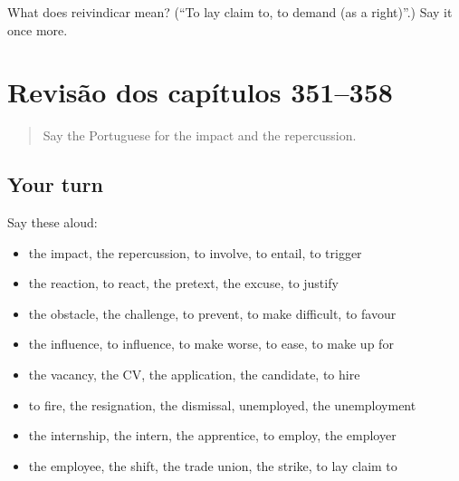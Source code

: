 \begin{tcolorbox}[breakable,colback=teal!4,colframe=teal!35!black,title={Before you move on}]
What does reivindicar mean? (\textquotedblleft{}To lay claim to, to demand (as a right)\textquotedblright{}.) Say it once more.
\end{tcolorbox}
\section[(dialogue)]{Revisão dos capítulos 351–358}

\label{lesson:PT-R358-revisao-351-358}



\begin{quote}
Say the Portuguese for the impact and the repercussion.
\end{quote}

\subsection*{Your turn}
Say these aloud:

\begin{itemize}
\raggedright
  \item the impact, the repercussion, to involve, to entail, to trigger
  \item the reaction, to react, the pretext, the excuse, to justify
  \item the obstacle, the challenge, to prevent, to make difficult, to favour
  \item the influence, to influence, to make worse, to ease, to make up for
  \item the vacancy, the CV, the application, the candidate, to hire
  \item to fire, the resignation, the dismissal, unemployed, the unemployment
  \item the internship, the intern, the apprentice, to employ, the employer
  \item the employee, the shift, the trade union, the strike, to lay claim to
\end{itemize}

